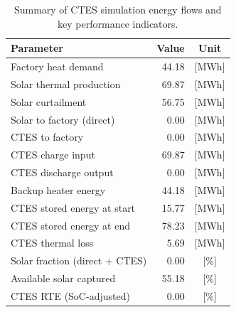 \renewcommand{\arraystretch}{1.2}
\begin{table}[h]
\centering
\begin{tabular}{l|r c}
\hline
Parameter & Value & Unit \\
\hline
Factory heat demand & 44.18 & [MWh] \\
Solar thermal production & 69.87 & [MWh] \\
Solar curtailment & 56.75 & [MWh] \\
Solar to factory (direct) & 0.00 & [MWh] \\
CTES to factory & 0.00 & [MWh] \\
CTES charge input & 69.87 & [MWh] \\
CTES discharge output & 0.00 & [MWh] \\
Backup heater energy & 44.18 & [MWh] \\
CTES stored energy at start & 15.77 & [MWh] \\
CTES stored energy at end & 78.23 & [MWh] \\
CTES thermal loss & 5.69 & [MWh] \\
\hline
Solar fraction (direct + CTES) & 0.00 & [\%] \\
Available solar captured & 55.18 & [\%] \\
CTES RTE (SoC-adjusted) & 0.00 & [\%] \\
\hline
\end{tabular}
\caption{Summary of CTES simulation energy flows and key performance indicators.}
\label{tab:ctes-simulation-summary}
\end{table}
